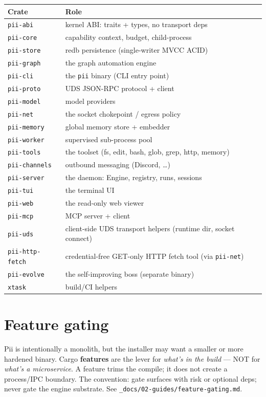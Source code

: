 \documentclass[
	fontsize=10pt,
	twoside=false,
	secnumdepth=2,
	open=any,
]{kaobook}
\begin{document}
\begin{longtable}{@{}ll@{}}
\toprule
\textbf{Crate} & \textbf{Role} \\
\midrule
\endhead
\texttt{pii-abi} & kernel ABI: traits + types, no transport deps \\
\texttt{pii-core} & capability context, budget, child-process \\
\texttt{pii-store} & redb persistence (single-writer MVCC ACID) \\
\texttt{pii-graph} & the graph automation engine \\
\texttt{pii-cli} & the \texttt{pii} binary (CLI entry point) \\
\texttt{pii-proto} & UDS JSON-RPC protocol + client \\
\texttt{pii-model} & model providers \\
\texttt{pii-net} & the socket chokepoint / egress policy \\
\texttt{pii-memory} & global memory store + embedder \\
\texttt{pii-worker} & supervised sub-process pool \\
\texttt{pii-tools} & the toolset (fs, edit, bash, glob, grep, http, memory) \\
\texttt{pii-channels} & outbound messaging (Discord, \ldots) \\
\texttt{pii-server} & the daemon: Engine, registry, runs, sessions \\
\texttt{pii-tui} & the terminal UI \\
\texttt{pii-web} & the read-only web viewer \\
\texttt{pii-mcp} & MCP server + client \\
\texttt{pii-uds} & client-side UDS transport helpers (runtime dir, socket connect) \\
\texttt{pii-http-fetch} & credential-free GET-only HTTP fetch tool (via \texttt{pii-net}) \\
\texttt{pii-evolve} & the self-improving boss (separate binary) \\
\texttt{xtask} & build/CI helpers \\
\bottomrule
\end{longtable}

\section{Feature gating}

Pii is intentionally a monolith, but the installer may want a smaller or
more hardened binary. Cargo \textbf{features} are the lever for
\emph{what's in the build} — NOT for \emph{what's a microservice}. A
feature trims the compile; it does not create a process/IPC boundary. The
convention: gate surfaces with risk or optional deps; never gate the
engine substrate. See \texttt{\_docs/02-guides/feature-gating.md}.
\end{document}
